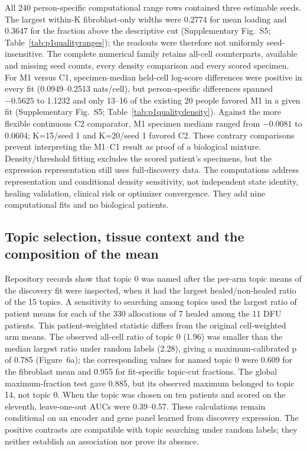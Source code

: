 \documentclass[10pt,a4paper]{article}
\begin{document}
All 240 person-specific computational range rows contained three estimable seeds. The largest within-K fibroblast-only widths were 0.2774 for mean loading and 0.3647 for the fraction above the descriptive cut (Supplementary Fig.~S5; Table~\ref{tab:p1qualityranges}); the readouts were therefore not uniformly seed-insensitive. The complete numerical family retains all-cell counterparts, available and missing seed counts, every density comparison and every scored specimen. For M1 versus C1, specimen-median held-cell log-score differences were positive in every fit (0.0949--0.2513 nats/cell), but person-specific differences spanned $-0.5625$ to 1.1232 and only 13--16 of the existing 20 people favored M1 in a given fit (Supplementary Fig.~S5; Table~\ref{tab:p1qualitydensity}). Against the more flexible continuous C2 comparator, M1 specimen medians ranged from $-0.0081$ to 0.0604; K=15/seed 1 and K=20/seed 1 favored C2. These contrary comparisons prevent interpreting the M1--C1 result as proof of a biological mixture. Density/threshold fitting excludes the scored patient's specimens, but the expression representation still uses full-discovery data. The computations address representation and conditional density sensitivity, not independent state identity, healing validation, clinical risk or optimizer convergence. They add nine computational fits and no biological patients.

\subsection{Topic selection, tissue context and the composition of the mean}

Repository records show that topic 0 was named after the per-arm topic means of the discovery fit were inspected, when it had the largest healed/non-healed ratio of the 15 topics. A sensitivity to searching among topics used the largest ratio of patient means for each of the 330 allocations of 7 healed among the 11 DFU patients. This patient-weighted statistic differs from the original cell-weighted arm means. The observed all-cell ratio of topic 0 (1.96) was smaller than the median largest ratio under random labels (2.28), giving a maximum-calibrated p of 0.785 (Figure~6a\label{call:p1f11}); the corresponding values for named topic 0 were 0.609 for the fibroblast mean and 0.955 for fit-specific topic-cut fractions. The global maximum-fraction test gave 0.885, but its observed maximum belonged to topic 14, not topic 0. When the topic was chosen on ten patients and scored on the eleventh, leave-one-out AUCs were 0.39--0.57. These calculations remain conditional on an encoder and gene panel learned from discovery expression. The positive contrasts are compatible with topic searching under random labels; they neither establish an association nor prove its absence.
\end{document}
